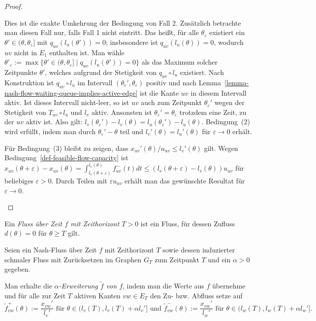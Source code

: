 \begin{proof}
\begin{description}[leftmargin=0cm, topsep=0cm, itemindent=\parindent]
		Dies ist die exakte Umkehrung der Bedingung von Fall 2.
		Zusätzlich betrachte man diesen Fall nur, falls Fall 1 nicht eintritt.
		Das heißt, für alle $\theta_\varepsilon$ existiert ein $\theta'\in(\theta, \theta_\varepsilon]$ mit $q_{uv}(l_u(\theta')) = 0$; insbesondere ist $q_{uv}(l_u(\theta))= 0$, wodurch $uv$ nicht in $E_1$ enthalten ist.
		Man wähle $\theta'_\varepsilon:=\max\{ \theta'\in (\theta, \theta_\varepsilon] \mid q_{uv}(l_u(\theta')) = 0 \}$ als das Maximum solcher Zeitpunkte $\theta'$, welches aufgrund der Stetigkeit von $q_{uv}\circ l_u$ existiert.
		Nach Konstruktion ist $q_{uv}\circ l_u$ im Intervall $(\theta_\varepsilon', \theta_\varepsilon)$ positiv und nach Lemma~\ref{lemma-nash-flow-waiting-queue-implies-active-edge} ist die Kante $uv$ in diesem Intervall aktiv.
		Ist dieses Intervall nicht-leer, so ist $uv$ auch zum Zeitpunkt $\theta_\varepsilon'$ wegen der Stetigkeit von $T_{uv}\circ l_u$ und $l_v$ aktiv.
		Ansonsten ist $\theta_\varepsilon'=\theta_\varepsilon$ trotzdem eine Zeit, zu der $uv$ aktiv ist.
		Also gilt: $l_v(\theta_\varepsilon') - l_v(\theta) = l_u(\theta_\varepsilon') - l_u(\theta)$.
		Bedingung~(2) wird erfüllt, indem man durch $\theta_\varepsilon'-\theta$ teil und $l_v'(\theta) = l_u'(\theta)$ für $\varepsilon\rightarrow0$ erhält.
		
		Für Bedingung~(3) bleibt zu zeigen, dass $x_{uv}'(\theta) /u_{uv}\leq l_v'(\theta)$ gilt.
		Wegen Bedingung~\ref{def-feasible-flow-capacity} ist $x_{uv}(\theta + \varepsilon)-x_{uv}(\theta) = \int_{l_v(\theta+\varepsilon)}^{l_v(\theta)} f_{uv}^-(t) dt\leq (l_v(\theta + \varepsilon) - l_v(\theta)) u_{uv}$ für beliebiges $\varepsilon>0$.
		Durch Teilen mit $\varepsilon u_{uv}$ erhält man das gewünschte Resultat für $\varepsilon\rightarrow 0$.
	\end{description}
\vspace{-1.2 \baselineskip}\end{proof}

\begin{definition}
	Ein \emph{Fluss über Zeit $f$ mit Zeithorizont $T>0$} ist ein Fluss, für dessen Zufluss $d(\theta)= 0$ für $\theta\geq T$ gilt.
\end{definition}

\begin{definition}
	Seien ein Nash-Fluss über Zeit $f$ mit Zeithorizont $T$ sowie dessen induzierter schmaler Fluss mit Zurücksetzen im Graphen $G_T$ zum Zeitpunkt $T$ und ein $\alpha > 0$ gegeben.
	
	
	Man erhalte die \emph{$\alpha$-Erweiterung $\tilde{f}$ von $f$}, indem man die Werte aus $f$ übernehme und für alle zur Zeit $T$ aktiven Kanten $vw\in E_T$ den Zu- bzw. Abfluss setze auf
	$$\tilde{f}_{vw}^+(\theta):= \frac{x_{vw}'}{l_v'} \text{ für $\theta\in (l_v(T), l_v(T)+\alpha l_v']$ und } \tilde{f}_{vw}^-(\theta):=\frac{x_{vw}'}{l_w'} \text{ für $\theta\in (l_w(T), l_w(T)+\alpha l_w']$.}$$
\end{definition}

